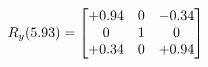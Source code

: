 \documentclass[preview]{standalone}
\begin{document}
\begin{align*}
\special{dvisvgm:raw <g id='unique000'>}R_{y}(5.93) = \begin{bmatrix}+0.94 & 0 & -0.34 \\0 & 1 & 0 \\+0.34 & 0 & +0.94\end{bmatrix}\special{dvisvgm:raw </g>}
\end{align*}
\end{document}
